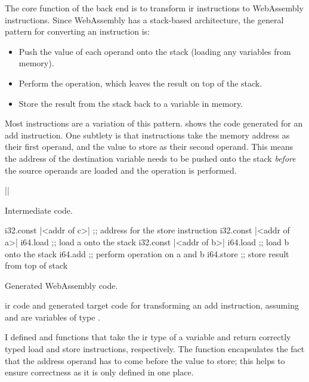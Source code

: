 \documentclass[00-main.tex]{subfiles}
\begin{document}
The core function of the back end is to transform \gls{ir} instructions to WebAssembly instructions.
Since WebAssembly has a stack-based architecture, the general pattern for converting an instruction is:
\begin{itemize}[nosep]
\item Push the value of each operand onto the stack (loading any variables from memory).
\item Perform the operation, which leaves the result on top of the stack.
\item Store the result from the stack back to a variable in memory.
\end{itemize}
Most instructions are a variation of this pattern.
 shows the code generated for an add instruction.
One subtlety is that  instructions take the memory address as their first operand, and the value to store as their second operand.
This means the address of the destination variable needs to be pushed onto the stack \emph{before} the source operands are loaded and the operation is performed.

\begin{listing}[t]
  \begin{sublisting}[b]{0.28\textwidth}
    \begin{TextListing}
      ||
    \end{TextListing}
    \caption{Intermediate code.}
  \end{sublisting}
  \hfill
  \begin{sublisting}[b]{0.7\textwidth}
    \begin{WasmListing}
      i32.const |<addr of c>|  ;; address for the store instruction
      i32.const |<addr of a>|
      i64.load               ;; load a onto the stack
      i32.const |<addr of b>|
      i64.load               ;; load b onto the stack
      i64.add                ;; perform operation on a and b
      i64.store              ;; store result from top of stack
    \end{WasmListing}
    \caption{Generated WebAssembly code.}
  \end{sublisting}
  \caption{\Gls{ir} code and generated target code for transforming an add instruction, assuming  and  are variables of type .}
  \label{lst:converting add instr to wasm code}
\end{listing}

I defined  and  functions that take the \gls{ir} type of a variable and return correctly typed load and store instructions, respectively.
The  function encapsulates the fact that the address operand has to come before the value to store; this helps to ensure correctness as it is only defined in one place.
\end{document}
